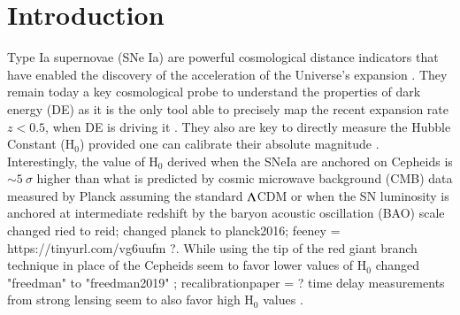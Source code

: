 \documentclass[]{aa} %
\newcommand{\nn}[1]{{\textcolor[rgb]{1, 0.27, 0}{#1}}}
\begin{document}
\section{Introduction}






Type Ia supernovae (SNe Ia) are powerful cosmological distance indicators that
have enabled the discovery of the acceleration of the Universe's expansion
\citep{riess1998, perlmutter1999}. They remain today a key cosmological probe to
understand the properties of dark energy (DE) as it is the only tool able to
precisely map the recent expansion rate $z<0.5$, when DE is driving it
\citep[e.g.][]{scolnicastro2020}. They also are key to directly measure the
Hubble Constant (H$_0$) provided one can calibrate their absolute magnitude
\citep{riess2016, freedman2019}. Interestingly, the value of H$_0$ derived when
the SNeIa are anchored on Cepheids \citep[the SH0ES
project][]{riess2009,riess2016} is $\sim5~\sigma$ higher than what is predicted
by cosmic microwave background (CMB) data measured by Planck assuming the
standard $\Lambda$CDM or when the SN luminosity is anchored at intermediate redshift
by the baryon acoustic oscillation (BAO) scale \citep{riess2019, reid2019,
planck2016, feeney} \nn{changed ried to reid; changed planck to planck2016;
feeney = https://tinyurl.com/vg6uufm ?}. While using the tip of the red giant
branch technique in place of the Cepheids seem to favor lower values of H$_0$
\citep{freedman2019, recalibrationpaper} \nn{changed "freedman" to
"freedman2019" ; recalibrationpaper = ?} time delay measurements from strong
lensing seem to also favor high H$_0$ values \citep{wong2019}.
\end{document}
